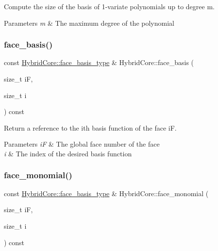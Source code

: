Compute the size of the basis of 1-\/variate polynomials up to degree m. 


\begin{DoxyParams}{Parameters}
{\em m} & The maximum degree of the polynomial \\
\hline
\end{DoxyParams}
\mbox{\label{classHArDCore3D_1_1HybridCore_a7bacf0ebee651940baa7f04af5a47b65}} 
\subsubsection{\texorpdfstring{face\+\_\+basis()}{face\_basis()}}
{\footnotesize\ttfamily const \hyperlink{classHArDCore3D_1_1HybridCore_ae0b0cdad94d3527d0b06e601c091cdad}{Hybrid\+Core\+::face\+\_\+basis\+\_\+type} \& Hybrid\+Core\+::face\+\_\+basis (\begin{DoxyParamCaption}\item[{size\+\_\+t}]{iF,  }\item[{size\+\_\+t}]{i }\end{DoxyParamCaption}) const}



Return a reference to the i\textquotesingle{}th basis function of the face iF. 


\begin{DoxyParams}{Parameters}
{\em iF} & The global face number of the face \\
\hline
{\em i} & The index of the desired basis function \\
\hline
\end{DoxyParams}
\mbox{\label{classHArDCore3D_1_1HybridCore_a4544ebe6193ab5239fdca5381043c031}} 
\subsubsection{\texorpdfstring{face\+\_\+monomial()}{face\_monomial()}}
{\footnotesize\ttfamily const \hyperlink{classHArDCore3D_1_1HybridCore_ae0b0cdad94d3527d0b06e601c091cdad}{Hybrid\+Core\+::face\+\_\+basis\+\_\+type} \& Hybrid\+Core\+::face\+\_\+monomial (\begin{DoxyParamCaption}\item[{size\+\_\+t}]{iF,  }\item[{size\+\_\+t}]{i }\end{DoxyParamCaption}) const}



